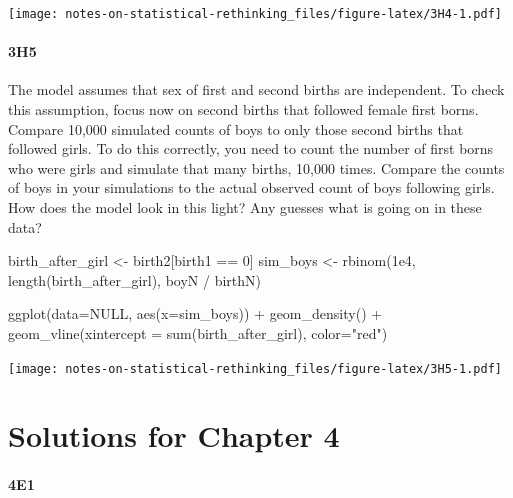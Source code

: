 \documentclass[
]{book}
\newenvironment{Shaded}{\begin{snugshade}}{\end{snugshade}}
\newcommand{\AttributeTok}[1]{\textcolor[rgb]{0.77,0.63,0.00}{#1}}
\newcommand{\ConstantTok}[1]{\textcolor[rgb]{0.00,0.00,0.00}{#1}}
\newcommand{\DecValTok}[1]{\textcolor[rgb]{0.00,0.00,0.81}{#1}}
\newcommand{\FloatTok}[1]{\textcolor[rgb]{0.00,0.00,0.81}{#1}}
\newcommand{\FunctionTok}[1]{\textcolor[rgb]{0.00,0.00,0.00}{#1}}
\newcommand{\NormalTok}[1]{#1}
\newcommand{\OtherTok}[1]{\textcolor[rgb]{0.56,0.35,0.01}{#1}}
\newcommand{\SpecialCharTok}[1]{\textcolor[rgb]{0.00,0.00,0.00}{#1}}
\newcommand{\StringTok}[1]{\textcolor[rgb]{0.31,0.60,0.02}{#1}}
\begin{document}
\texttt{[image: notes-on-statistical-rethinking\_files/figure-latex/3H4-1.pdf]}

\hypertarget{h5}{%
\subsubsection*{3H5}\label{h5}}

The model assumes that sex of first and second births are independent. To check this assumption, focus now on second births that followed female first borns. Compare 10,000 simulated counts of boys to only those second births that followed girls. To do this correctly, you need to count the number of first borns who were girls and simulate that many births, 10,000 times. Compare the counts of boys in your simulations to the actual observed count of boys following girls. How does the model look in this light? Any guesses what is going on in these data?

\begin{Shaded}
\begin{Highlighting}[]
\NormalTok{birth\_after\_girl }\OtherTok{\textless{}{-}}\NormalTok{ birth2[birth1 }\SpecialCharTok{==} \DecValTok{0}\NormalTok{]}
\NormalTok{sim\_boys }\OtherTok{\textless{}{-}} \FunctionTok{rbinom}\NormalTok{(}\FloatTok{1e4}\NormalTok{, }\FunctionTok{length}\NormalTok{(birth\_after\_girl), boyN }\SpecialCharTok{/}\NormalTok{ birthN)}

\FunctionTok{ggplot}\NormalTok{(}\AttributeTok{data=}\ConstantTok{NULL}\NormalTok{, }\FunctionTok{aes}\NormalTok{(}\AttributeTok{x=}\NormalTok{sim\_boys)) }\SpecialCharTok{+} 
  \FunctionTok{geom\_density}\NormalTok{() }\SpecialCharTok{+} 
  \FunctionTok{geom\_vline}\NormalTok{(}\AttributeTok{xintercept =} \FunctionTok{sum}\NormalTok{(birth\_after\_girl), }\AttributeTok{color=}\StringTok{"red"}\NormalTok{)}
\end{Highlighting}
\end{Shaded}

\texttt{[image: notes-on-statistical-rethinking\_files/figure-latex/3H5-1.pdf]}

\hypertarget{solutions-for-chapter-4}{%
\chapter{Solutions for Chapter 4}\label{solutions-for-chapter-4}}

\hypertarget{e1-2}{%
\subsubsection*{4E1}\label{e1-2}}
\end{document}
